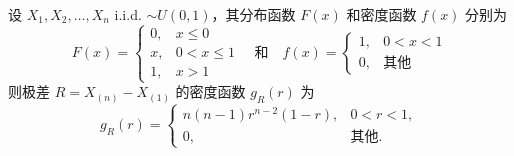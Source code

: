 \begin{proposition} \label{prop:uniform_range_distribution}
设 $X_1, X_2, \ldots, X_n$ i.i.d. $\sim U(0,1)$，其分布函数 $F(x)$ 和密度函数 $f(x)$ 分别为
\[
F(x)=
\begin{cases}
0, & x \le 0 \\
x, & 0 < x \le 1 \\
1, & x > 1
\end{cases}
\quad \text{和} \quad
f(x)=
\begin{cases}
1, & 0 < x < 1 \\
0, & \text{其他}
\end{cases}
\]
则极差 $R = X_{(n)} - X_{(1)}$ 的密度函数 $g_R(r)$ 为
\begin{equation} \label{eq:uniform_range_pdf}
g_R(r)=
\begin{cases}
n(n-1)r^{n-2}(1-r), & 0 < r < 1, \\
0, & \text{其他}.
\end{cases}
\end{equation}
\end{proposition}


